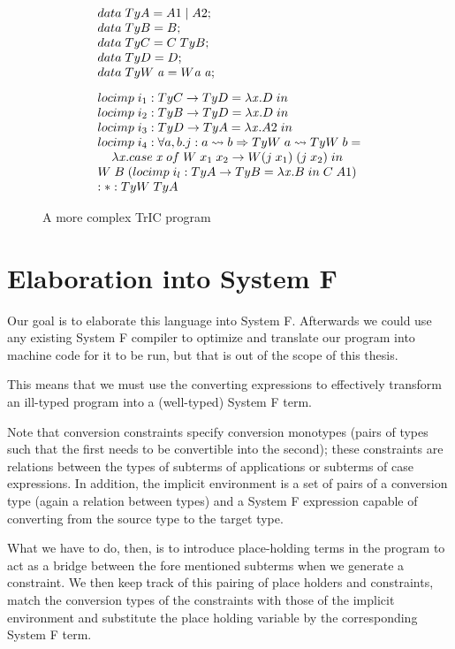 \begin{figure}
     \[
\begin{array}{@{\hspace{0mm}}l@{\hspace{0mm}}}
  data\;TyA=A1\;|\;A2;\\
  data\;TyB=B;\\
  data\;TyC=C \; TyB;\\
  data\;TyD=D;\\
  data\;TyW\;\tyVar=W \tyVar \; \tyVar;\\[3mm]
  \monolocal{i_1}{TyC}{TyD}{\lambda \tmVar . D}\\
  \monolocal{i_2}{TyB}{TyD}{\lambda \tmVar . D}\\
  \monolocal{i_3}{TyD}{TyA}{\lambda \tmVar . A2}\\
  locimp\;i_4 :\forall a, b . j : a \rightsquigarrow b \Rightarrow TyW\;a\rightsquigarrow TyW\;b=\\
  \phantom{xx}\lambda \tmVar. case\;\tmVar\; of\;W\;x_1\;x_2 \to W (j\;x_1)\;(j\;x_2)\;in \\
  W\;B\;(\monolocal{i_l}{TyA}{TyB}{\lambda \tmVar.B} C\;A1)
  \\
  :*: TyW \; TyA
\end{array}
\]
\caption{A more complex TrIC program}
\label{complex5}
\end{figure}

\section{Elaboration into System F}
Our goal is to elaborate this language into System F. Afterwards we could use any existing System F compiler to optimize and translate our program into machine code for it to be run, but that is out of the scope of this thesis.

This means that we must use the converting expressions to effectively transform an ill-typed program into a (well-typed) System F term.

Note that conversion constraints specify conversion monotypes (pairs of types such that the first needs to be convertible into the second); these constraints are relations between the types of subterms of applications or subterms of case expressions. In addition, the implicit environment is a set of pairs of a conversion type (again a relation between types) and a System F expression capable of converting from the source type to the target type.

What we have to do, then, is to introduce place-holding terms in the program to act as a bridge between the fore mentioned subterms when we generate a constraint. We then keep track of this pairing of place holders and constraints, match the conversion types of the constraints with those of the implicit environment and substitute the place holding variable by the corresponding System F term.

